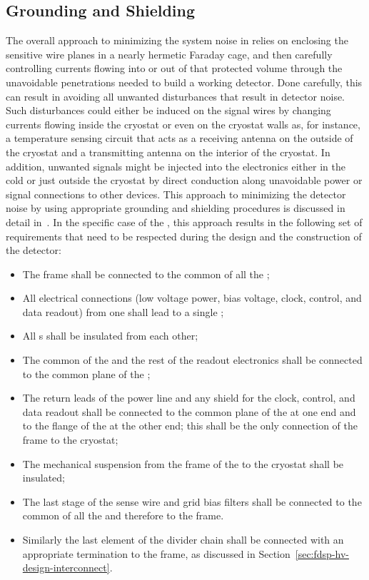 \subsection{Grounding and Shielding}
\label{sec:fdsp-tpcelec-design-grounding}

The overall approach to minimizing the system noise in  
relies on enclosing the sensitive wire planes in a nearly hermetic 
Faraday cage, and then carefully controlling currents flowing into or 
out of that protected volume through the unavoidable penetrations 
needed to build a working detector. Done carefully, this can result 
in avoiding all unwanted disturbances that result in detector noise. 
Such disturbances could either be induced on the signal wires by 
changing currents flowing inside the cryostat or even on the cryostat 
walls as, for instance, a temperature sensing circuit that acts as a 
receiving antenna on the outside of the cryostat and a transmitting 
antenna on the interior of the cryostat. In addition, unwanted signals 
might be injected into the electronics either in the cold or just 
outside the cryostat by direct conduction along unavoidable power 
or signal connections to other devices. This approach to minimizing
the detector noise by using appropriate grounding and shielding procedures
is discussed in detail in~\cite{radekaNoise}. In the specific case
of the  , this approach results in the 
following set of requirements that need to be respected during the
design and the construction of the detector:
\begin{itemize}
\item{The  frame shall be connected to the common of
all the  ;}
\item{All electrical connections (low voltage power, bias voltage,
clock, control, and data readout) from one  shall lead to a 
single ;}
\item{All s shall be insulated from each other;}
\item{The common of the   and the rest of the 
 readout electronics shall be connected to
the common plane of the ;}
\item{The return leads of the  power line and any shield
for the clock, control, and data readout shall be connected
to the common plane of the  at one end and
to the flange of the  at the other end; this shall be 
the only connection of the  frame to the cryostat;}
\item{The mechanical suspension from the frame of the 
to the cryostat shall be insulated;}
\item{The last stage of the sense wire and grid bias filters shall be
connected to the common of all the   and therefore
to the  frame.}
\item{Similarly the last element of the  divider chain shall
be connected with an appropriate termination to the 
frame, as discussed in Section~\ref{sec:fdsp-hv-design-interconnect}.}
\end{itemize}

